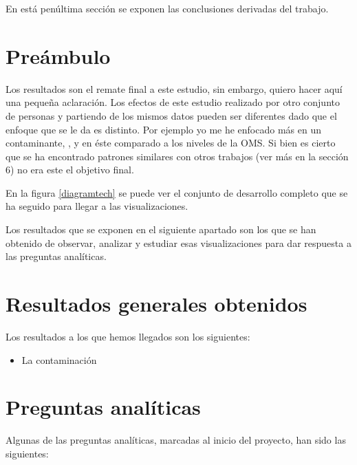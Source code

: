 
En está penúltima sección se exponen las conclusiones derivadas del trabajo. 



\section{Preámbulo}
Los resultados son el remate final a este estudio, sin embargo, quiero hacer aquí una pequeña aclaración. Los efectos de este estudio realizado por otro conjunto de personas y partiendo de los mismos datos pueden ser diferentes dado que el enfoque que se le da es distinto. Por ejemplo yo me he enfocado más en un contaminante, , y en éste comparado a los niveles de la OMS. Si bien es cierto que se ha encontrado patrones similares con otros trabajos (ver más en la sección 6) no era este el objetivo final. 

En la figura \ref{diagramtech} se puede ver el conjunto de desarrollo completo que se ha seguido para llegar a las visualizaciones.

  
  Los resultados que se exponen en el siguiente apartado son los que se han obtenido de observar, analizar y estudiar esas visualizaciones para dar respuesta a las preguntas analíticas. 
  

\section{Resultados generales obtenidos}
Los resultados a los que hemos llegados son los siguientes:

\begin{itemize}
	\item La contaminación
\end{itemize}

\section{Preguntas analíticas}

Algunas de las preguntas analíticas, marcadas al inicio del proyecto, han sido las siguientes:

